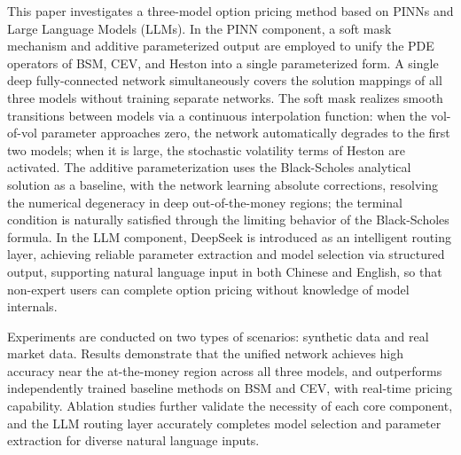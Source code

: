 This paper investigates a three-model option pricing method based on PINNs and Large Language Models (LLMs). In the PINN component, a soft mask mechanism and additive parameterized output are employed to unify the PDE operators of BSM, CEV, and Heston into a single parameterized form. A single deep fully-connected network simultaneously covers the solution mappings of all three models without training separate networks. The soft mask realizes smooth transitions between models via a continuous interpolation function: when the vol-of-vol parameter approaches zero, the network automatically degrades to the first two models; when it is large, the stochastic volatility terms of Heston are activated. The additive parameterization uses the Black-Scholes analytical solution as a baseline, with the network learning absolute corrections, resolving the numerical degeneracy in deep out-of-the-money regions; the terminal condition is naturally satisfied through the limiting behavior of the Black-Scholes formula. In the LLM component, DeepSeek is introduced as an intelligent routing layer, achieving reliable parameter extraction and model selection via structured output, supporting natural language input in both Chinese and English, so that non-expert users can complete option pricing without knowledge of model internals.

Experiments are conducted on two types of scenarios: synthetic data and real market data. Results demonstrate that the unified network achieves high accuracy near the at-the-money region across all three models, and outperforms independently trained baseline methods on BSM and CEV, with real-time pricing capability. Ablation studies further validate the necessity of each core component, and the LLM routing layer accurately completes model selection and parameter extraction for diverse natural language inputs.

